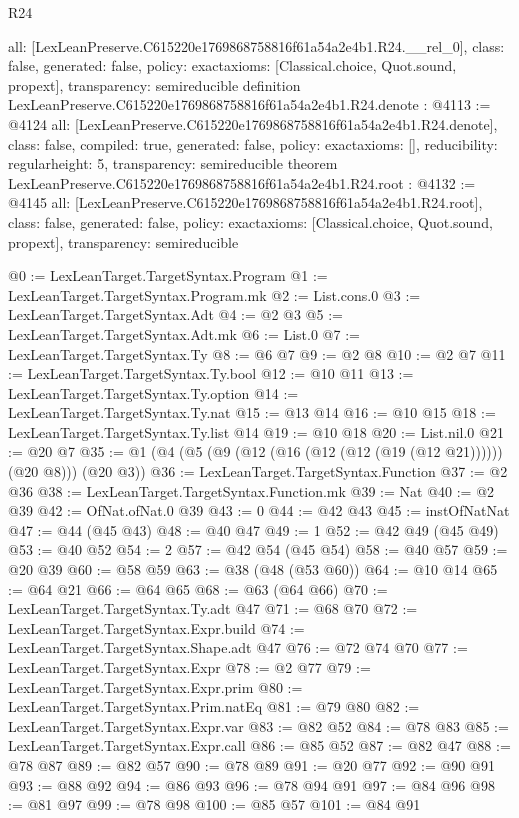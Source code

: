 \begin{lexlean}{R24}
\begin{coremodule}
{  all: [LexLeanPreserve.C615220e1769868758816f61a54a2e4b1.R24.__rel_0],
  class: false,
  generated: false,
  policy: exact{axioms: [Classical.choice, Quot.sound, propext]},
  transparency: semireducible
}
definition LexLeanPreserve.C615220e1769868758816f61a54a2e4b1.R24.denote : @4113 := @4124 {
  all: [LexLeanPreserve.C615220e1769868758816f61a54a2e4b1.R24.denote],
  class: false,
  compiled: true,
  generated: false,
  policy: exact{axioms: []},
  reducibility: regular{height: 5},
  transparency: semireducible
}
theorem LexLeanPreserve.C615220e1769868758816f61a54a2e4b1.R24.root : @4132 := @4145 {
  all: [LexLeanPreserve.C615220e1769868758816f61a54a2e4b1.R24.root],
  class: false,
  generated: false,
  policy: exact{axioms: [Classical.choice, Quot.sound, propext]},
  transparency: semireducible
}

@0 := LexLeanTarget.TargetSyntax.Program
@1 := LexLeanTarget.TargetSyntax.Program.mk
@2 := List.cons.{0}
@3 := LexLeanTarget.TargetSyntax.Adt
@4 := @2 @3
@5 := LexLeanTarget.TargetSyntax.Adt.mk
@6 := List.{0}
@7 := LexLeanTarget.TargetSyntax.Ty
@8 := @6 @7
@9 := @2 @8
@10 := @2 @7
@11 := LexLeanTarget.TargetSyntax.Ty.bool
@12 := @10 @11
@13 := LexLeanTarget.TargetSyntax.Ty.option
@14 := LexLeanTarget.TargetSyntax.Ty.nat
@15 := @13 @14
@16 := @10 @15
@18 := LexLeanTarget.TargetSyntax.Ty.list @14
@19 := @10 @18
@20 := List.nil.{0}
@21 := @20 @7
@35 := @1 (@4 (@5 (@9 (@12 (@16 (@12 (@12 (@19 (@12 @21)))))) (@20 @8))) (@20 @3))
@36 := LexLeanTarget.TargetSyntax.Function
@37 := @2 @36
@38 := LexLeanTarget.TargetSyntax.Function.mk
@39 := Nat
@40 := @2 @39
@42 := OfNat.ofNat.{0} @39
@43 := 0
@44 := @42 @43
@45 := instOfNatNat
@47 := @44 (@45 @43)
@48 := @40 @47
@49 := 1
@52 := @42 @49 (@45 @49)
@53 := @40 @52
@54 := 2
@57 := @42 @54 (@45 @54)
@58 := @40 @57
@59 := @20 @39
@60 := @58 @59
@63 := @38 (@48 (@53 @60))
@64 := @10 @14
@65 := @64 @21
@66 := @64 @65
@68 := @63 (@64 @66)
@70 := LexLeanTarget.TargetSyntax.Ty.adt @47
@71 := @68 @70
@72 := LexLeanTarget.TargetSyntax.Expr.build
@74 := LexLeanTarget.TargetSyntax.Shape.adt @47
@76 := @72 @74 @70
@77 := LexLeanTarget.TargetSyntax.Expr
@78 := @2 @77
@79 := LexLeanTarget.TargetSyntax.Expr.prim
@80 := LexLeanTarget.TargetSyntax.Prim.natEq
@81 := @79 @80
@82 := LexLeanTarget.TargetSyntax.Expr.var
@83 := @82 @52
@84 := @78 @83
@85 := LexLeanTarget.TargetSyntax.Expr.call
@86 := @85 @52
@87 := @82 @47
@88 := @78 @87
@89 := @82 @57
@90 := @78 @89
@91 := @20 @77
@92 := @90 @91
@93 := @88 @92
@94 := @86 @93
@96 := @78 @94 @91
@97 := @84 @96
@98 := @81 @97
@99 := @78 @98
@100 := @85 @57
@101 := @84 @91

\end{coremodule}
\end{lexlean}
